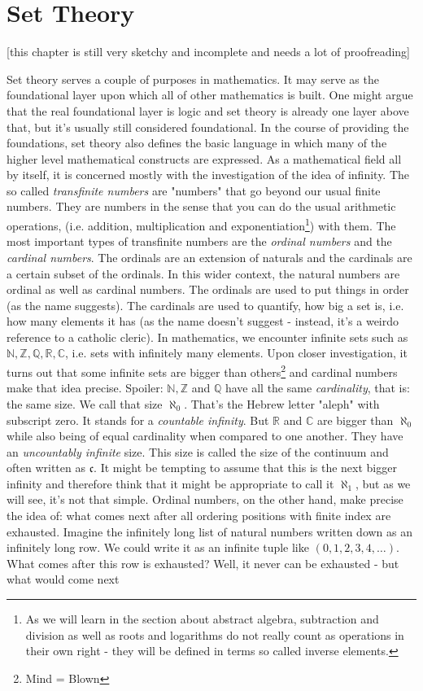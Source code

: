 \chapter{Set Theory}
[this chapter is still very sketchy and incomplete and needs a lot of proofreading]



Set theory serves a couple of purposes in mathematics. It may serve as the foundational layer upon which all of other mathematics is built. One might argue that the real foundational layer is logic and set theory is already one layer above that, but it's usually still considered foundational. In the course of providing the foundations, set theory also defines the basic language in which many of the higher level mathematical constructs are expressed. As a mathematical field all by itself, it is concerned mostly with the investigation of the idea of infinity. The so called \emph{transfinite numbers} are "numbers" that go beyond our usual finite numbers. They are numbers in the sense that you can do the usual arithmetic operations, (i.e. addition, multiplication and exponentiation\footnote{As we will learn in the section about abstract algebra, subtraction and division as well as roots and logarithms do not really count as operations in their own right - they will be defined in terms so called inverse elements.}) with them. The most important types of transfinite numbers are the \emph{ordinal numbers} and the \emph{cardinal numbers}. The ordinals are an extension of naturals and the cardinals are a certain subset of the ordinals. In this wider context, the natural numbers are ordinal as well as cardinal numbers. The ordinals are used to put things in order (as the name suggests). The cardinals are used to quantify, how big a set is, i.e. how many elements it has (as the name doesn't suggest - instead, it's a weirdo reference to a catholic cleric). In mathematics, we encounter infinite sets such as $\mathbb{N}, \mathbb{Z}, \mathbb{Q}, \mathbb{R}, \mathbb{C}$, i.e. sets with infinitely many elements. Upon closer investigation, it turns out that some infinite sets are bigger than others\footnote{Mind = Blown} and cardinal numbers make that idea precise. Spoiler: $\mathbb{N}, \mathbb{Z}$ and $\mathbb{Q}$ have all the same \emph{cardinality}, that is: the same size. We call that size $\aleph_0$. That's the Hebrew letter "aleph" with subscript zero. It stands for a \emph{countable infinity}. But $\mathbb{R}$ and $\mathbb{C}$ are bigger than $\aleph_0$ while also being of equal cardinality when compared to one another. They have an \emph{uncountably infinite} size. This size is called the size of the continuum and often written as $\mathfrak{c}$. It might be tempting to assume that this is the next bigger infinity and therefore think that it might be appropriate to call it $\aleph_1$, but as we will see, it's not that simple. Ordinal numbers, on the other hand, make precise the idea of: what comes next after all ordering positions with finite index are exhausted. Imagine the infinitely long list of natural numbers written down as an infinitely long row. We could write it as an infinite tuple like $(0,1,2,3,4,\ldots)$. What comes after this row is exhausted? Well, it never can be exhausted - but what would come next 